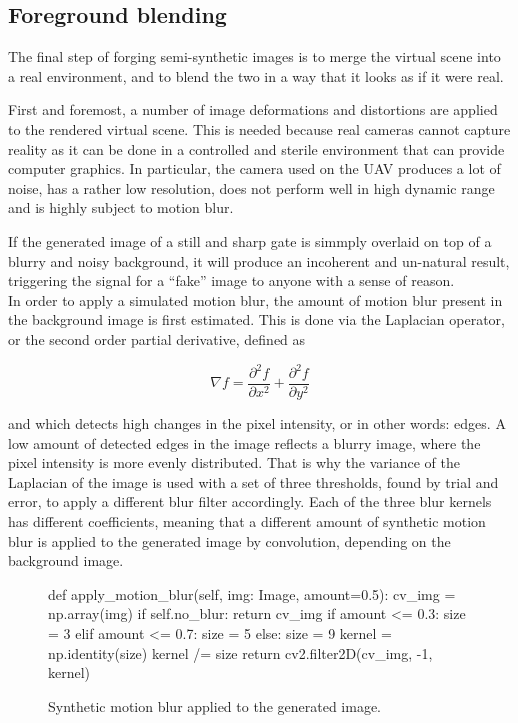 \subsection{Foreground blending}

The final step of forging semi-synthetic images is to merge the virtual scene
into a real environment, and to blend the two in a way that it looks as if it
were real.

First and foremost, a number of image deformations and distortions are applied
to the rendered virtual scene. This is needed because real cameras cannot
capture reality as it can be done in a controlled and sterile environment that
can provide computer graphics. In particular, the camera used on the UAV
produces a lot of noise, has a rather low resolution, does not perform well in
high dynamic range and is highly subject to motion blur.

If the generated image of a still and sharp gate is simmply overlaid on top of
a blurry and noisy background, it will produce an incoherent and un-natural
result, triggering the signal for a ``fake'' image to anyone with a sense of
reason.\\

In order to apply a simulated motion blur, the amount of motion blur present in
the background image is first estimated. This is done via the Laplacian
operator, or the second order partial derivative, defined as

\begin{equation} \label{equ:laplacianoperator}
    \nabla f = \frac{\partial^2 f}{\partial x^2}
        + \frac{\partial^2 f}{\partial y^2}
\end{equation}

and which detects high changes in the pixel intensity, or in other words:
edges. A low amount of detected edges in the image reflects a blurry image,
where the pixel intensity is more evenly distributed. That is why the variance
of the Laplacian of the image is used with a set of three thresholds, found by
trial and error, to apply a different blur filter accordingly. Each of the
three blur kernels has different coefficients, meaning that a different amount
of synthetic motion blur is applied to the generated image by convolution,
depending on the background image.\\
\begin{figure}[h!]
    \centering
    \caption{Synthetic motion blur applied to the generated image.}
    \begin{python}
        def apply_motion_blur(self, img: Image, amount=0.5):
            cv_img = np.array(img)
            if self.no_blur: return cv_img
            if amount <= 0.3:
                size = 3
            elif amount <= 0.7:
                size = 5
            else:
                size = 9
            kernel = np.identity(size)
            kernel /= size
            return cv2.filter2D(cv_img, -1, kernel)
    \end{python}
\end{figure}

